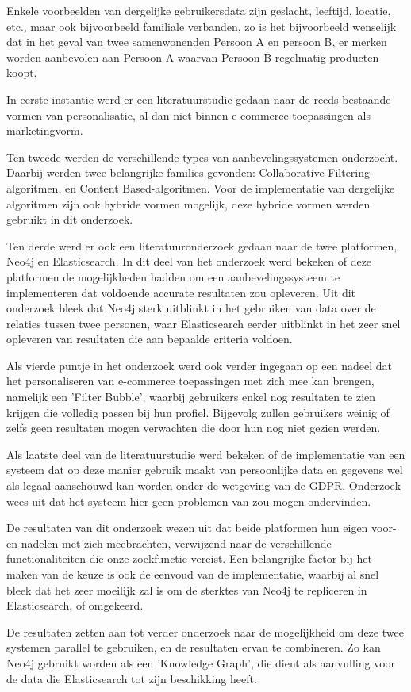 Enkele voorbeelden van dergelijke gebruikersdata zijn geslacht, leeftijd, locatie, etc., maar ook bijvoorbeeld familiale verbanden, zo is het bijvoorbeeld wenselijk dat in het geval van twee samenwonenden Persoon A en persoon B, er merken worden aanbevolen aan Persoon A waarvan Persoon B regelmatig producten koopt.

In eerste instantie werd er een literatuurstudie gedaan naar de reeds bestaande vormen van personalisatie, al dan niet binnen e-commerce toepassingen als marketingvorm.

Ten tweede werden de verschillende types van aanbevelingssystemen onderzocht. Daarbij werden twee belangrijke families gevonden: Collaborative Filtering-algoritmen, en Content Based-algoritmen. Voor de implementatie van dergelijke algoritmen zijn ook hybride vormen mogelijk, deze hybride vormen werden gebruikt in dit onderzoek.

Ten derde werd er ook een literatuuronderzoek gedaan naar de twee platformen, Neo4j en Elasticsearch. In dit deel van het onderzoek werd bekeken of deze platformen de mogelijkheden hadden om een aanbevelingssysteem te implementeren dat voldoende accurate resultaten zou opleveren. Uit dit onderzoek bleek dat Neo4j sterk uitblinkt in het gebruiken van data over de relaties tussen twee personen, waar Elasticsearch eerder uitblinkt in het zeer snel opleveren van resultaten die aan bepaalde criteria voldoen.

Als vierde puntje in het onderzoek werd ook verder ingegaan op een nadeel dat het personaliseren van e-commerce toepassingen met zich mee kan brengen, namelijk een 'Filter Bubble', waarbij gebruikers enkel nog resultaten te zien krijgen die volledig passen bij hun profiel. Bijgevolg zullen gebruikers weinig of zelfs geen resultaten mogen verwachten die door hun nog niet gezien werden.

Als laatste deel van de literatuurstudie werd bekeken of de implementatie van een systeem dat op deze manier gebruik maakt van persoonlijke data en gegevens wel als legaal aanschouwd kan worden onder de wetgeving van de GDPR. Onderzoek wees uit dat het systeem hier geen problemen van zou mogen ondervinden.

De resultaten van dit onderzoek wezen uit dat beide platformen hun eigen voor- en nadelen met zich meebrachten, verwijzend naar de verschillende functionaliteiten die onze zoekfunctie vereist. Een belangrijke factor bij het maken van de keuze is ook de eenvoud van de implementatie, waarbij al snel bleek dat het zeer moeilijk zal is om de sterktes van Neo4j te repliceren in Elasticsearch, of omgekeerd.

De resultaten zetten aan tot verder onderzoek naar de mogelijkheid om deze twee systemen parallel te gebruiken, en de resultaten ervan te combineren.  Zo kan Neo4j gebruikt worden als een 'Knowledge Graph', die dient als aanvulling voor de data die Elasticsearch tot zijn beschikking heeft. 


